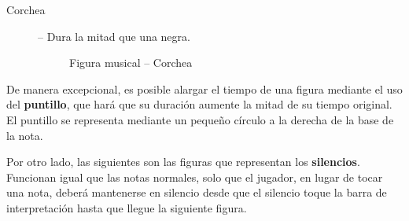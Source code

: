 \begin{description}
\vspace{-0.35cm}

\item[Corchea] -- Dura la mitad que una negra.
\vspace{-0.1cm}
\begin{figure}[h!]
  \centering
  \caption{Figura musical -- Corchea}
\end{figure}
\end{description}

\vspace{-0.35cm}

De manera excepcional, es posible alargar el tiempo de una figura mediante el
uso del \textbf{puntillo}, que hará que su duración aumente la mitad de su
tiempo original. El puntillo se representa mediante un pequeño círculo a la
derecha de la base de la nota.

Por otro lado, las siguientes son las figuras que representan los
\textbf{silencios}. Funcionan igual que las notas normales, solo que el jugador,
en lugar de tocar una nota, deberá mantenerse en silencio desde que el silencio
toque la barra de interpretación hasta que llegue la siguiente figura.

